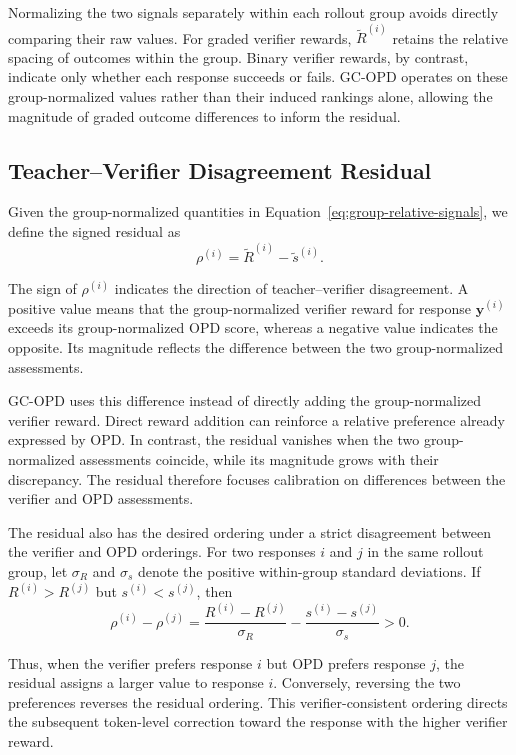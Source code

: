 Normalizing the two signals separately within each rollout group avoids directly comparing their raw values. For graded verifier rewards, $\tilde{R}^{(i)}$ retains the relative spacing of outcomes within the group. Binary verifier rewards, by contrast, indicate only whether each response succeeds or fails. GC-OPD operates on these group-normalized values rather than their induced rankings alone, allowing the magnitude of graded outcome differences to inform the residual.

\subsection{Teacher--Verifier Disagreement Residual}

Given the group-normalized quantities in Equation~\ref{eq:group-relative-signals}, we define the signed residual as
\begin{equation}
\rho^{(i)}=\tilde{R}^{(i)}-\tilde{s}^{(i)}.
\label{eq:residual}
\end{equation}

The sign of $\rho^{(i)}$ indicates the direction of teacher--verifier disagreement. A positive value means that the group-normalized verifier reward for response $\mathbf{y}^{(i)}$ exceeds its group-normalized OPD score, whereas a negative value indicates the opposite. Its magnitude reflects the difference between the two group-normalized assessments.

GC-OPD uses this difference instead of directly adding the group-normalized verifier reward. Direct reward addition can reinforce a relative preference already expressed by OPD. In contrast, the residual vanishes when the two group-normalized assessments coincide, while its magnitude grows with their discrepancy. The residual therefore focuses calibration on differences between the verifier and OPD assessments.

The residual also has the desired ordering under a strict disagreement between the verifier and OPD orderings. For two responses $i$ and $j$ in the same rollout group, let $\sigma_R$ and $\sigma_s$ denote the positive within-group standard deviations. If $R^{(i)}>R^{(j)}$ but $s^{(i)}<s^{(j)}$, then
\begin{equation}
\rho^{(i)}-\rho^{(j)}
=
\frac{R^{(i)}-R^{(j)}}{\sigma_R}
-
\frac{s^{(i)}-s^{(j)}}{\sigma_s}
>0.
\label{eq:pairwise-residual-direction}
\end{equation}

Thus, when the verifier prefers response $i$ but OPD prefers response $j$, the residual assigns a larger value to response $i$. Conversely, reversing the two preferences reverses the residual ordering. This verifier-consistent ordering directs the subsequent token-level correction toward the response with the higher verifier reward.

